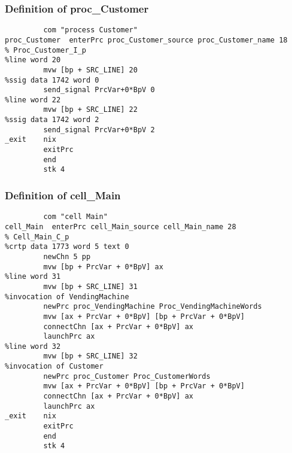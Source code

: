 \subsubsection{Definition of proc\_Customer}
\begin{verbatim}
         com "process Customer"
proc_Customer  enterPrc proc_Customer_source proc_Customer_name 18
% Proc_Customer_I_p 
%line word 20
         mvw [bp + SRC_LINE] 20
%ssig data 1742 word 0
         send_signal PrcVar+0*BpV 0  
%line word 22
         mvw [bp + SRC_LINE] 22
%ssig data 1742 word 2
         send_signal PrcVar+0*BpV 2  
_exit    nix
         exitPrc
         end
         stk 4
\end{verbatim}

\subsubsection{Definition of cell\_Main}
\begin{verbatim}
         com "cell Main"
cell_Main  enterPrc cell_Main_source cell_Main_name 28
% Cell_Main_C_p 
%crtp data 1773 word 5 text 0
         newChn 5 pp   
         mvw [bp + PrcVar + 0*BpV] ax      
%line word 31
         mvw [bp + SRC_LINE] 31
%invocation of VendingMachine
         newPrc proc_VendingMachine Proc_VendingMachineWords
         mvw [ax + PrcVar + 0*BpV] [bp + PrcVar + 0*BpV] 
         connectChn [ax + PrcVar + 0*BpV] ax 
         launchPrc ax
%line word 32
         mvw [bp + SRC_LINE] 32
%invocation of Customer
         newPrc proc_Customer Proc_CustomerWords
         mvw [ax + PrcVar + 0*BpV] [bp + PrcVar + 0*BpV] 
         connectChn [ax + PrcVar + 0*BpV] ax 
         launchPrc ax
_exit    nix
         exitPrc
         end
         stk 4
\end{verbatim}
